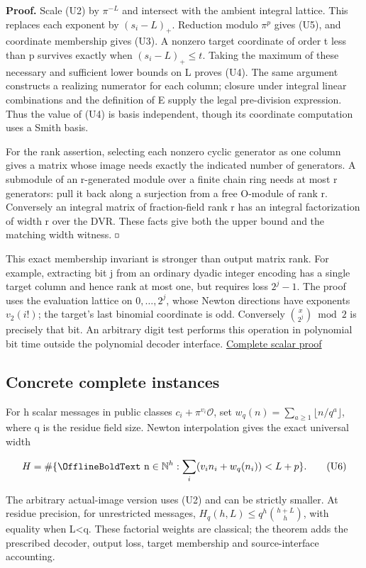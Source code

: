\documentclass[11pt,a4paper]{article}
\renewcommand{\square}{\mathord{\vcenter{\hbox{\fboxsep=0pt\fboxrule=.4pt\fbox{\rule{0pt}{.7ex}\rule{.7ex}{0pt}}}}}}
\renewcommand{\boldsymbol}[1]{\mathord{\mathchoice
  {\hbox{\OfflineBoldText #1}}{\hbox{\OfflineBoldText #1}}
  {\hbox{\OfflineBoldScript #1}}{\hbox{\OfflineBoldScriptScript #1}}}}
\begin{document}
\textbf{Proof.} Scale (U2) by \(\pi^{-L}\) and intersect with the
ambient integral lattice. This replaces each exponent by \((s_i-L)_+\).
Reduction modulo \(\pi^p\) gives (U5), and coordinate membership gives
(U3). A nonzero target coordinate of order t less than p survives
exactly when \((s_i-L)_+\le t\). Taking the maximum of these necessary
and sufficient lower bounds on L proves (U4). The same argument
constructs a realizing numerator for each column; closure under integral
linear combinations and the definition of E supply the legal
pre-division expression. Thus the value of (U4) is basis independent,
though its coordinate computation uses a Smith basis.

For the rank assertion, selecting each nonzero cyclic generator as one
column gives a matrix whose image needs exactly the indicated number of
generators. A submodule of an r-generated module over a finite chain
ring needs at most r generators: pull it back along a surjection from a
free O-module of rank r. Conversely an integral matrix of fraction-field
rank r has an integral factorization of width r over the DVR. These
facts give both the upper bound and the matching width witness.
\(\square\)

This exact membership invariant is stronger than output matrix rank. For
example, extracting bit j from an ordinary dyadic integer encoding has a
single target column and hence rank at most one, but requires loss
\(2^j-1\). The proof uses the evaluation lattice on \(0,\ldots,2^j\),
whose Newton directions have exponents \(v_2(i!)\); the target's last
binomial coordinate is odd. Conversely \(\binom{x}{2^j}\bmod2\) is
precisely that bit. An arbitrary digit test performs this operation in
polynomial bit time outside the polynomial decoder interface.
\hyperref[v8-section-nonlinear-budget]{Complete scalar proof}

\subsection{Concrete complete
instances}\label{v8-concrete-complete-instances}

For h scalar messages in public classes \(c_i+\pi^{v_i}\mathcal O\), set
\(w_q(n)=\sum_{a\ge1}\lfloor n/q^a\rfloor\), where q is the residue
field size. Newton interpolation gives the exact universal width

\[
 H=\#\{\boldsymbol n\in\mathbb N^h:
       \sum_i(v_i n_i+w_q(n_i))<L+p\}. \tag{U6}
\]

The arbitrary actual-image version uses (U2) and can be strictly
smaller. At residue precision, for unrestricted messages,
\(H_q(h,L)\le q^h\binom{h+L}{h}\), with equality when L\textless q.
These factorial weights are classical; the theorem adds the prescribed
decoder, output loss, target membership and source-interface accounting.
\end{document}
